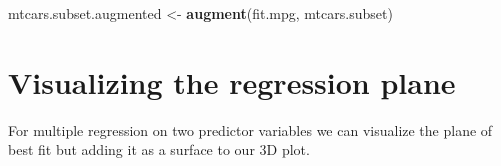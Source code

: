 \documentclass[]{book}
\newenvironment{Shaded}{\begin{snugshade}}{\end{snugshade}}
\newcommand{\KeywordTok}[1]{\textcolor[rgb]{0.13,0.29,0.53}{\textbf{#1}}}
\newcommand{\NormalTok}[1]{#1}
\newcommand{\StringTok}[1]{\textcolor[rgb]{0.31,0.60,0.02}{#1}}
\theoremstyle{definition}
\theoremstyle{definition}
\theoremstyle{definition}
\theoremstyle{remark}
\begin{document}
\begin{Shaded}
\begin{Highlighting}[]
\NormalTok{mtcars.subset.augmented <-}
\StringTok{  }\KeywordTok{augment}\NormalTok{(fit.mpg, mtcars.subset)}
\end{Highlighting}
\end{Shaded}

\hypertarget{visualizing-the-regression-plane}{%
\section{Visualizing the regression
plane}\label{visualizing-the-regression-plane}}

For multiple regression on two predictor variables we can visualize the
plane of best fit but adding it as a surface to our 3D plot.
\end{document}
